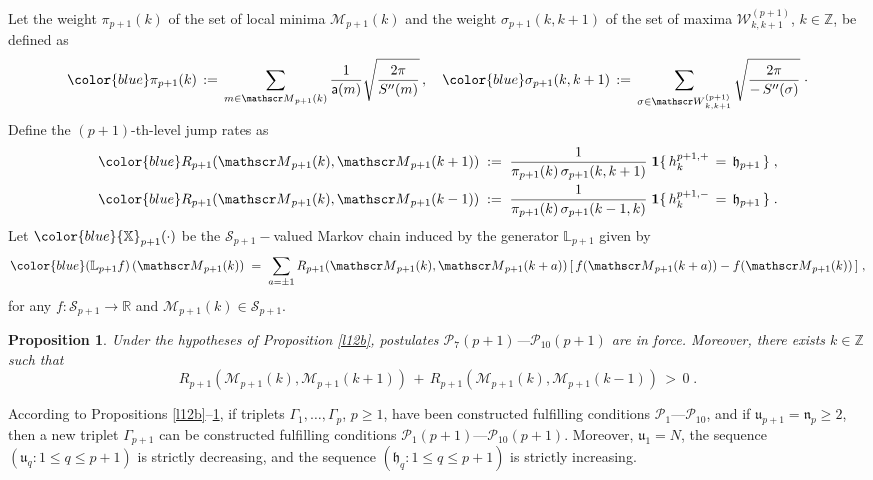\documentclass[reqno]{amsart}
\theoremstyle{plain}
\newtheorem{proposition}[theorem]{Proposition}
\theoremstyle{definition}
\newcommand{\mc}[1]{{\mathcal #1}}
\newcommand{\mb}[1]{{\mathbf #1}}
\newcommand{\mf}[1]{{\mathfrak #1}}
\newcommand{\bb}[1]{{\mathbb #1}}
\newcommand{\ms}[1]{{\mathscr #1}}
\newcommand{\mss}[1]{{\textsf #1}}
\newcounter{as}[section]
\newcommand{\<}{\langle}
\renewcommand{\>}{\rangle}
\begin{document}
Let the weight $\pi_{p+1}(k)$ of the set of local minima
$\ms M_{p+1}(k)$ and the weight $\sigma_{p+1}(k,k+1)$ of the set of
maxima $\ms W^{(p+1)}_{k,k+1}$, $k\in \bb Z$, be defined as
\begin{equation}
\label{01}
{\color{blue}\pi_{p+1}(k)} \,:=\,
\sum_{m\in \ms M_{p+1}(k)}
\frac{1}{\mss a (m)}
\sqrt{\frac{2\pi}{S''(m)}}\,, \quad
{\color{blue}\sigma_{p+1}(k,k+1)} \,:= \,
\sum_{ \sigma\in \ms W^{(p+1)}_{k,k+1}}
\sqrt{\frac{2\pi}{-\, S''(\sigma)}}\;\cdot
\end{equation}
Define the $(p+1)$-th-level jump rates as
\begin{equation}
\label{50}
\begin{gathered}
{\color{blue}R_{p+1}(\ms M_{p+1}(k),\ms M_{p+1}(k+1))} \; :=
\; \frac{1}{\pi_{p+1}(k) \, \sigma_{p+1}(k,k+1)}\;
\mb 1\{\, h^{p+1,+}_{k} \,=\,  \mf h_{p+1} \,\} \;,
\\
{\color{blue}R_{p+1}(\ms M_{p+1}(k),\ms M_{p+1}(k-1))} \; :=
\; \frac{1}{\pi_{p+1}(k)\, \sigma_{p+1}(k-1,k)}
\; \mb 1\{\,  h^{p+1,-}_{k} \,=\,  \mf h_{p+1} \,\} \;.
\end{gathered}
\end{equation}
Let ${\color{blue}\bb X_{p+1}(\cdot)}$ be the $\ms S_{p+1}-$valued
Markov chain induced by the generator $\bb L_{p+1}$ given by
\begin{equation}
\label{83}
{\color{blue}(\bb L_{p+1}f)\, (\ms M_{p+1}(k))}
\;=\; \sum_{a = \pm 1} R_{p+1}(\ms M_{p+1}(k), \ms
M_{p+1}(k+ a)) \,
[\, f(\ms M_{p+1}(k+a)) - f(\ms M_{p+1}(k)) \,]\;,
\end{equation}
for any $f\colon \ms S_{p+1} \to \bb R$ and
$\ms M_{p+1}(k)\in \ms S_{p+1}$. 

\begin{proposition}
\label{l10b}
Under the hypotheses of Proposition \ref{l12b}, postulates
$\mc P_7(p+1)$---$\mc P_{10}(p+1)$ are in force. Moreover,
there exists $k\in \bb Z$ such that
\begin{equation}
\label{79}
R_{p+1}(\ms M_{p+1}(k),\ms M_{p+1}(k+1))
\,+\, R_{p+1}(\ms M_{p+1}(k),\ms M_{p+1}(k-1)) \,>\, 0\;.
\end{equation}
\end{proposition}

According to Propositions \ref{l12b}--\ref{l10b}, if triplets
$\Gamma_1, \dots, \Gamma_p$, $p\ge 1$, have been constructed
fulfilling conditions $\mc P_1$---$\mc P_{10}$, and if
$\mf u_{p+1} = \mf n_{p}\ge 2$, then a new triplet $\Gamma_{p+1}$ can
be constructed fulfilling conditions $\mc
P_1(p+1)$---$\mc P_{10}(p+1)$. Moreover, $\mf u_1=N$, the sequence
$(\mf u_q :1\le q\le p+1)$ is strictly decreasing, and the sequence
$(\mf h_q :1\le q\le p+1)$ is strictly increasing.
\end{document}
